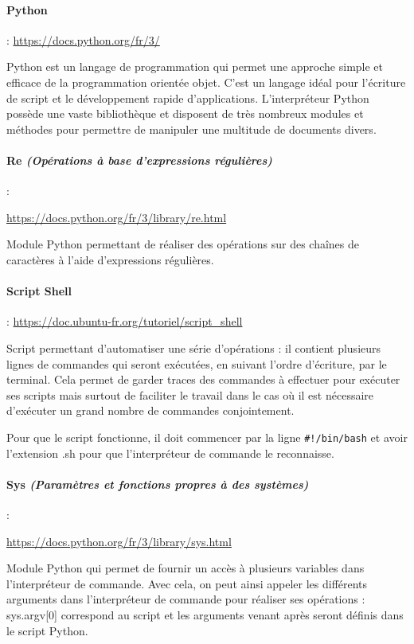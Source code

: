 \paragraph{Python} : \url{https://docs.python.org/fr/3/}

Python est un langage de programmation qui permet une approche simple et efficace de la programmation orientée objet. C'est un langage idéal pour l'écriture de script et le développement rapide d'applications. L'interpréteur Python possède une vaste bibliothèque et disposent de très nombreux modules et méthodes pour permettre de manipuler une multitude de documents divers.

\paragraph{Re \textit{(Opérations à base d'expressions régulières)}} :

\url{https://docs.python.org/fr/3/library/re.html}

Module Python permettant de réaliser des opérations sur des chaînes de caractères à l'aide d'expressions régulières.

\paragraph{Script Shell} : \url{https://doc.ubuntu-fr.org/tutoriel/script_shell}

Script permettant d'automatiser une série d'opérations : il contient plusieurs lignes de commandes qui seront exécutées, en suivant l'ordre d'écriture, par le terminal. Cela permet de garder traces des commandes à effectuer pour exécuter ses scripts mais surtout de faciliter le travail dans le cas où il est nécessaire d'exécuter un grand nombre de commandes conjointement.

Pour que le script fonctionne, il doit commencer par la ligne
\texttt{#!/bin/bash} et avoir l'extension .sh pour que l'interpréteur de commande le reconnaisse.

\paragraph{Sys \textit{(Paramètres et fonctions propres à des systèmes)}}:

\url{https://docs.python.org/fr/3/library/sys.html}

Module Python qui permet de fournir un accès à plusieurs variables dans l'interpréteur de commande. Avec cela, on peut ainsi appeler les différents arguments dans l'interpréteur de commande pour réaliser ses opérations : sys.argv[0] correspond au script et les arguments venant après seront définis dans le script Python.

